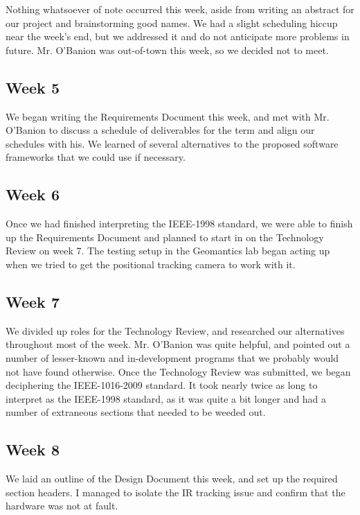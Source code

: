 \documentclass{article}
\begin{document}
Nothing whatsoever of note occurred this week, aside from writing an abstract for our project and brainstorming good names. 
We had a slight scheduling hiccup near the week's end, but we addressed it and do not anticipate more problems in future. 
Mr. O'Banion was out-of-town this week, so we decided not to meet.

\subsection{Week 5}

We began writing the Requirements Document this week, and met with Mr. O'Banion to discuss a schedule of deliverables for the term and align our schedules with his. 
We learned of several alternatives to the proposed software frameworks that we could use if necessary.

\subsection{Week 6}

Once we had finished interpreting the IEEE-1998 standard, we were able to finish up the Requirements Document and planned to start in on the Technology Review on week 7. 
The testing setup in the Geomantics lab began acting up when we tried to get the positional tracking camera to work with it.

\subsection{Week 7}

We divided up roles for the Technology Review, and researched our alternatives throughout most of the week. 
Mr. O'Banion was quite helpful, and pointed out a number of lesser-known and in-development programs that we probably would not have found otherwise. 
Once the Technology Review was submitted, we began deciphering the IEEE-1016-2009 standard. 
It took nearly twice as long to interpret as the IEEE-1998 standard, as it was quite a bit longer and had a number of extraneous sections that needed to be weeded out. 

\subsection{Week 8}

We laid an outline of the Design Document this week, and set up the required section headers. 
I managed to isolate the IR tracking issue and confirm that the hardware was not at fault.
\end{document}
